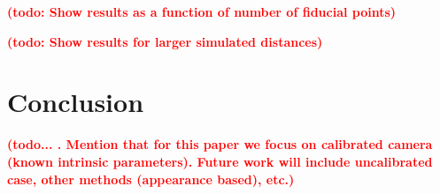 \documentclass[runningheads]{llncs}
\newcommand {\afbnote} [1] {{\bf \textcolor{red}{(#1)}}}
\begin{document}
\afbnote{todo: Show results as a function of number of fiducial points}

\afbnote{todo: Show results for larger simulated distances}

\section{Conclusion}
\afbnote{todo... .  Mention that for this paper we focus on calibrated camera (known intrinsic parameters).  Future work will include uncalibrated case, other methods (appearance based), etc.}



\end{document}
